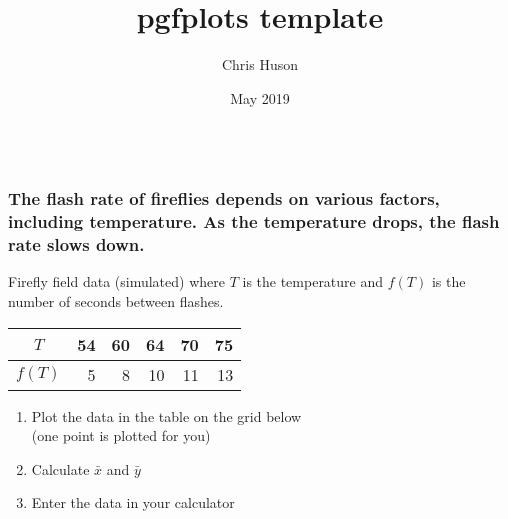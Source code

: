 \documentclass[12pt, oneside]{article}
\title{pgfplots template}
\author{Chris Huson}
\date{May 2019}
\begin{document}
\subsubsection*{\\ \textnormal{The flash rate of fireflies depends on various factors, including temperature. As the temperature drops, the flash rate slows down.
}}



Firefly field data (simulated) where $T$ is the temperature and $f(T)$ is the number of seconds between flashes. \\[10pt]
\begin{tabular}{|c|r|r|r|r|r|}
\hline
$T$ & 54 & 60 & 64 & 70 & 75 \\ [3pt]
\hline
$f(T)$ & 5 & 8 & 10 & 11 & 13  \\  [3pt]
\hline
\end{tabular}
\begin{enumerate}
    \item Plot the data in the table on the grid below \\
    (one point is plotted for you)
    \item Calculate $\bar{x}$ and $\bar{y}$
    \item Enter the data in your calculator
\end{enumerate}

\vspace{1in}
{}
\end{document}
